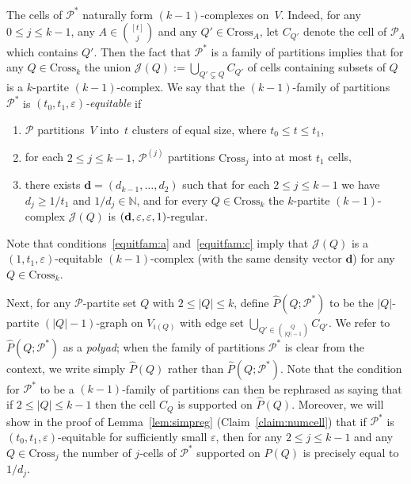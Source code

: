 \documentclass[12pt,a4paper]{amsart}
\def\itm#1{\rm ({#1})}
\def\itmit#1{\itm{\it #1\,}}
\def\abc{\itmit{\alph{*}}}
\let\eps\varepsilon
\newcommand{\NATS}{\mathbb{N}}
\newcommand{\cJ}{\mathcal{J}}
\newcommand{\Part}{\mathcal{P}}
\newcommand{\cross}{\textrm{Cross}}
\begin{document}
The cells of $\Part^*$ naturally form $(k-1)$-complexes on~$V$. 
Indeed, for any $0 \leq j \leq k-1$, any $A \in
\binom{[t]}{j}$ and any $Q' \in \cross_A$, let $C_{Q'}$ denote the cell of
$\Part_{A}$ which contains $Q'$. 
Then the fact that $\Part^*$ is a family of partitions implies that 
for any $Q \in \cross_k$ the union 
$\cJ(Q) := \bigcup_{Q' \subsetneq Q} C_{Q'}$ 
of cells containing subsets of $Q$ is a
$k$-partite $(k-1)$-complex.
We say that the $(k-1)$-family of partitions $\Part^*$ is \emph{$(t_0,
t_1, \eps)$-equitable} if 
\begin{enumerate}[label=\abc]
  \item\label{equitfam:a} $\Part$ partitions~$V$ into~$t$ clusters of equal size, where
  $t_0 \leq t \leq t_1$,
  \item\label{equitfam:b} for each $2 \leq j \leq k-1$, $\Part^{(j)}$ partitions
  $\cross_j$ into at most $t_1$ cells,
  \item\label{equitfam:c} there exists ${\mathbf{d}}=( d_{k-1},
  \dots, d_2)$ such that for each $2 \leq j \leq k-1$ we have $d_j \geq
  1/t_1$ and $1/d_j \in \NATS$, and for every $Q \in \cross_k$ the $k$-partite
  $(k-1)$-complex 
$\cJ(Q)$ 
is $({\bf d},\eps,\eps,1)$-regular.
\end{enumerate}
Note that conditions~\ref{equitfam:a} and~\ref{equitfam:c} imply that $\cJ(Q)$ is a $(1, t_1,
\eps)$-equitable $(k-1)$-complex (with the same density vector $\mathbf{d}$) for any $Q \in \cross_k$.

Next, for any $\Part$-partite set $Q$ with $2 \leq |Q| \leq k$, define $\hat{P}(Q; \Part^*)$
to be the $|Q|$-partite $(|Q|-1)$-graph on $V_{i(Q)}$ with edge set $\bigcup_{Q' \in
\binom{Q}{|Q|-1}} C_{Q'}$. We refer to $\hat{P}(Q; \Part^*)$ as a \emph{polyad}; when the family of partitions $\Part^*$ is clear from the context, we write simply $\hat{P}(Q)$ rather than $\hat{P}(Q; \Part^*)$. 
Note that the condition for $\Part^*$ to be a $(k-1)$-family of partitions can then be rephrased as saying that if $2 \leq |Q| \leq k-1$ then the cell $C_Q$ is supported on $\hat{P}(Q)$. 
Moreover, we will show in the proof of Lemma~\ref{lem:simpreg} (Claim~\ref{claim:numcell}) that if $\Part^*$ is $(t_0, t_1, \eps)$-equitable for sufficiently small $\eps$, then for any $2 \leq j \leq k-1$ and any $Q \in \cross_j$ the number of $j$-cells of $\Part^*$ supported on $\hat{P}(Q)$ is precisely equal to $1/d_j$.
\end{document}
